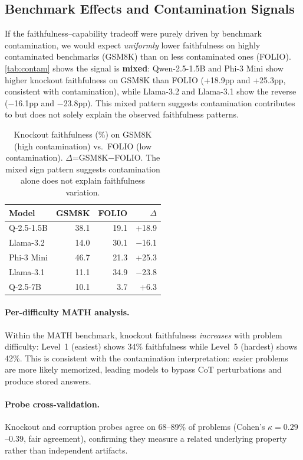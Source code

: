 \documentclass[11pt]{article}
\begin{document}
\subsection{Benchmark Effects and Contamination Signals}
\label{sec:contamination}

If the faithfulness--capability tradeoff were purely driven by benchmark contamination, we would expect \emph{uniformly} lower faithfulness on highly contaminated benchmarks (GSM8K) than on less contaminated ones (FOLIO). \autoref{tab:contam} shows the signal is \textbf{mixed}: Qwen-2.5-1.5B and Phi-3 Mini show higher knockout faithfulness on GSM8K than FOLIO (+18.9pp and +25.3pp, consistent with contamination), while Llama-3.2 and Llama-3.1 show the reverse ($-$16.1pp and $-$23.8pp). This mixed pattern suggests contamination contributes to but does not solely explain the observed faithfulness patterns.

\begin{table}[t]
\centering\small
\begin{tabular}{lrrr}
\toprule
\textbf{Model} & \textbf{GSM8K} & \textbf{FOLIO} & \textbf{$\Delta$} \\
\midrule
Q-2.5-1.5B & 38.1 & 19.1 & +18.9 \\
Llama-3.2 & 14.0 & 30.1 & $-$16.1 \\
Phi-3 Mini & 46.7 & 21.3 & +25.3 \\
\midrule
Llama-3.1 & 11.1 & 34.9 & $-$23.8 \\
Q-2.5-7B & 10.1 & 3.7 & +6.3 \\
\bottomrule
\end{tabular}
\caption{Knockout faithfulness (\%) on GSM8K (high contamination) vs.\ FOLIO (low contamination). $\Delta$=GSM8K$-$FOLIO. The mixed sign pattern suggests contamination alone does not explain faithfulness variation.}
\label{tab:contam}
\end{table}

\paragraph{Per-difficulty MATH analysis.} Within the MATH benchmark, knockout faithfulness \emph{increases} with problem difficulty: Level~1 (easiest) shows 34\% faithfulness while Level~5 (hardest) shows 42\%. This is consistent with the contamination interpretation: easier problems are more likely memorized, leading models to bypass CoT perturbations and produce stored answers.

\paragraph{Probe cross-validation.} Knockout and corruption probes agree on 68--89\% of problems (Cohen's $\kappa{=}0.29$--$0.39$, fair agreement), confirming they measure a related underlying property rather than independent artifacts.
\end{document}
